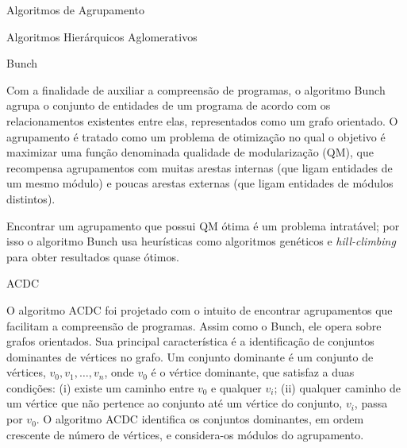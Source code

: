 \begin{chapter}{Algoritmos de Agrupamento}
\begin{section}{Algoritmos Hierárquicos Aglomerativos}
\end{section}

\begin{section}{Bunch}

Com a finalidade de auxiliar a compreensão de programas, o algoritmo Bunch \cite{Mancoridis1998} agrupa o conjunto de entidades de um programa de acordo com os relacionamentos existentes entre elas, representados como um grafo orientado. O agrupamento é tratado como um problema de otimização no qual o objetivo é maximizar uma função denominada qualidade de modularização (QM), que recompensa agrupamentos com muitas arestas internas (que ligam entidades de um mesmo módulo) e poucas arestas externas (que ligam entidades de módulos distintos).

Encontrar um agrupamento que possui QM ótima é um problema intratável; por isso o algoritmo Bunch usa heurísticas como algoritmos genéticos e \emph{hill-climbing} para obter resultados quase ótimos.

\end{section}

\begin{section}{ACDC}

O algoritmo ACDC \cite{Tzerpos2000} foi projetado com o intuito de encontrar agrupamentos que facilitam a compreensão de programas. Assim como o Bunch, ele opera sobre grafos orientados. Sua principal característica é a identificação de conjuntos dominantes de vértices no grafo. Um conjunto dominante é um conjunto de vértices, $v_0, v_1, \ldots{}, v_n$, onde $v_0$ é o vértice dominante, que satisfaz a duas condições: (i) existe um caminho entre $v_0$ e qualquer $v_i$; (ii) qualquer caminho de um vértice que não pertence ao conjunto até um vértice do conjunto, $v_i$, passa por $v_0$. O algoritmo ACDC identifica os conjuntos dominantes, em ordem crescente de número de vértices, e considera-os módulos do agrupamento. 

	
\end{section}	

\end{chapter}


